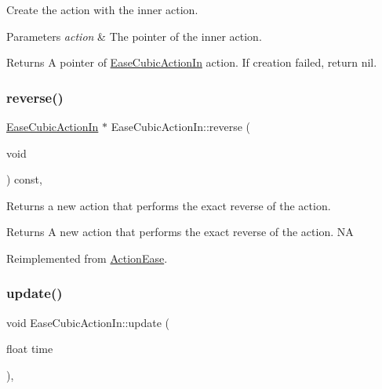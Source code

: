 Create the action with the inner action. 


\begin{DoxyParams}{Parameters}
{\em action} & The pointer of the inner action. \\
\hline
\end{DoxyParams}
\begin{DoxyReturn}{Returns}
A pointer of \hyperlink{classEaseCubicActionIn}{Ease\+Cubic\+Action\+In} action. If creation failed, return nil. 
\end{DoxyReturn}
\mbox{\label{classEaseCubicActionIn_aebf0f24c3890ea180706332f02d41b64}} 
\subsubsection{\texorpdfstring{reverse()}{reverse()}}
{\footnotesize\ttfamily \hyperlink{classEaseCubicActionIn}{Ease\+Cubic\+Action\+In} $\ast$ Ease\+Cubic\+Action\+In\+::reverse (\begin{DoxyParamCaption}\item[{void}]{ }\end{DoxyParamCaption}) const\hspace{0.3cm}{\ttfamily [override]}, {\ttfamily [virtual]}}

Returns a new action that performs the exact reverse of the action.

\begin{DoxyReturn}{Returns}
A new action that performs the exact reverse of the action.  NA 
\end{DoxyReturn}


Reimplemented from \hyperlink{classActionEase_ab99eb083fa033fae1d6c948fdc730782}{Action\+Ease}.

\mbox{\label{classEaseCubicActionIn_a245bc3028244567a11dbe02bc2e11a10}} 
\subsubsection{\texorpdfstring{update()}{update()}}
{\footnotesize\ttfamily void Ease\+Cubic\+Action\+In\+::update (\begin{DoxyParamCaption}\item[{float}]{time }\end{DoxyParamCaption})\hspace{0.3cm}{\ttfamily [override]}, {\ttfamily [virtual]}}

